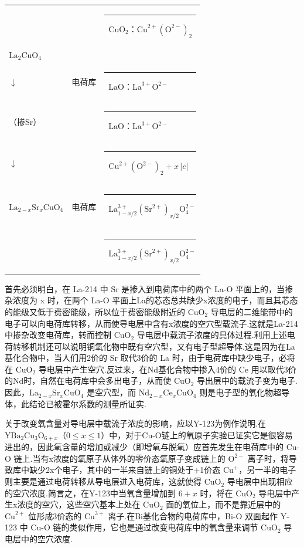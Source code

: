 \begin{center}\small
\begin{tabular}{lll}
 & & \rule[-0.3ex]{2.0cm}{0.4pt}\ $\mathrm{CuO}_{2}$：$\mathrm{Cu}^{2+}(\mathrm{O}^{2-})_{2}$\\
$\mathrm{La}_{2}\mathrm{CuO}_{4}$ & & \\
$\downarrow$ & 电荷库 & \quad\rule[-0.3ex]{1.4cm}{0.4pt}\ $\mathrm{LaO}$：$\mathrm{La}^{3+}\mathrm{O}^{2-}$\\
（掺Sr） & & \quad\rule[-0.3ex]{1.4cm}{0.4pt}\ $\mathrm{LaO}$：$\mathrm{La}^{3+}\mathrm{O}^{2-}$\\
$\downarrow$ & & \rule[-0.3ex]{2.0cm}{0.4pt}\ $\mathrm{Cu}^{2+}(\mathrm{O}^{2-})_{2}+x\,|e|$\\
$\mathrm{La}_{2-x}\mathrm{Sr}_{x}\mathrm{CuO}_{4}$ & 电荷库 & \quad\rule[-0.3ex]{1.4cm}{0.4pt}\ $\mathrm{La}^{3+}_{1-x/2}(\mathrm{Sr}^{2+})_{x/2}\mathrm{O}^{2-}_{4}$\\
 & & \quad\rule[-0.3ex]{1.4cm}{0.4pt}\ $\mathrm{La}^{3+}_{1-x/2}(\mathrm{Sr}^{2+})_{x/2}\mathrm{O}^{2-}_{4}$\\
\end{tabular}
\end{center}

首先必须明白，在 La-214 中 Sr 是掺入到电荷库中的两个 La-O 平面上的，当掺杂浓度为 x 时，在两个 La-O 平面上La的芯态总共缺少x浓度的电子，而且其芯态的能级又低于费密能级，所以位于费密能级附近的 $\mathrm{CuO}_{2}$ 导电层的二维能带中的电子可以向电荷库转移，从而使导电层中含有x浓度的空穴型载流子.这就是La-214中掺杂改变电荷库，转而控制 $\mathrm{CuO}_{2}$ 导电层中载流子浓度的具体过程.利用上述电荷转移机制还可以说明铜氧化物中既有空穴型，又有电子型超导体.这是因为在La基化合物中，当人们用2价的 Sr 取代3价的 La 时，由于电荷库中缺少电子，必将在 $\mathrm{CuO}_{2}$ 导电层中产生空穴.反过来，在Nd基化合物中掺入4价的 Ce 用以取代3价的Nd时，自然在电荷库中会多出电子，从而使 $\mathrm{CuO}_{2}$ 导出层中的载流子变为电子.因此，$\mathrm{La}_{2-x}\mathrm{Sr}_{x}\mathrm{CuO}_{4}$ 是空穴型，而 $\mathrm{Nd}_{2-x}\mathrm{Ce}_{x}\mathrm{CuO}_{4}$ 则是电子型的氧化物超导体，此结论已被霍尔系数的测量所证实.

关于改变氧含量对导电层中载流子浓度的影响，应以Y-123为例作说明.在 $\mathrm{YBa}_{2}\mathrm{Cu}_{3}\mathrm{O}_{6+x}$（$0\leqslant x\leqslant1$）中，对于Cu-O链上的氧原子实验已证实它是很容易进出的，因此氧含量的增加或减少（即增氧与脱氧）应首先发生在电荷库中的 Cu-O 链上.当有x浓度的氧原子从体外的零价态氧原子变成链上的 $\mathrm{O}^{2-}$ 离子时，将导致库中缺少2x个电子，其中的一半来自链上的铜处于+1价态 $\mathrm{Cu}^{+}$，另一半的电子则主要是通过电荷转移从导电层进入电荷库，这就使得 $\mathrm{CuO}_{2}$ 导电层中出现相应的空穴浓度.简言之，在Y-123中当氧含量增加到 $6+x$ 时，将在 $\mathrm{CuO}_{2}$ 导电层中产生x浓度的空穴，这些空穴基本上处在 $\mathrm{CuO}_{2}$ 面的氧位上，而不是靠近层中的 $\mathrm{Cu}^{2+}$ 位形成3价态的 $\mathrm{Cu}^{3+}$ 离子.在Bi基化合物的电荷库中，Bi-O 双面起作 Y-123 中 Cu-O 链的类似作用，它也是通过改变电荷库中的氧含量来调节 $\mathrm{CuO}_{2}$ 导电层中的空穴浓度.

